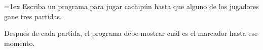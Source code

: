 \begin{minipage}[t]{.65\textwidth}
  \parskip=1ex
  Escriba un programa para jugar cachipún
  hasta que alguno de los jugadores gane tres partidas.

  Después de cada partida,
  el programa debe mostrar
  cuál es el marcador hasta ese momento.
\end{minipage}
\hfill
\begin{minipage}[t]{.30\textwidth}
  
\end{minipage}

